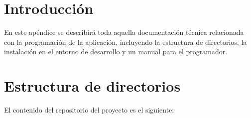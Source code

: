 
\section{Introducción}

En este apéndice se describirá toda aquella documentación técnica relacionada con la programación de la aplicación, incluyendo la estructura de directorios, la instalación en el entorno de desarrollo y un manual para el programador.

\section{Estructura de directorios}

El contenido del repositorio del proyecto es el siguiente:

